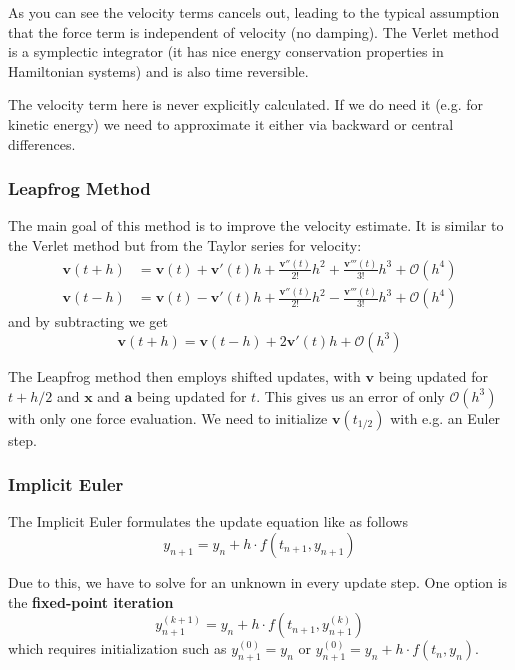 \documentclass{article}
\begin{document}
As you can see the velocity terms cancels out, leading to the typical assumption that the force term is independent of velocity (no damping).
The Verlet method is a symplectic integrator (it has nice energy conservation properties in Hamiltonian systems) and is also time reversible.

The velocity term here is never explicitly calculated.
If we do need it (e.g. for kinetic energy) we need to approximate it either via backward or central differences.

\subsubsection{Leapfrog Method}
The main goal of this method is to improve the velocity estimate.
It is similar to the Verlet method but from the Taylor series for velocity:
\begin{align}
    \bm{v}(t+h) &= \bm{v}(t) + \bm{v}'(t)h + \frac{\bm{v}''(t)}{2!}h^2 + \frac{\bm{v}'''(t)}{3!} h^3 + \mathcal{O}(h^4)\\
    \bm{v}(t-h) &= \bm{v}(t) - \bm{v}'(t)h + \frac{\bm{v}''(t)}{2!}h^2 - \frac{\bm{v}'''(t)}{3!} h^3 + \mathcal{O}(h^4)
\end{align}
and by subtracting we get
\begin{equation}
    \bm{v}(t+h) = \bm{v}(t-h) + 2\bm{v}'(t)h + \mathcal{O}(h^3)
\end{equation}

The Leapfrog method then employs shifted updates, with $\bm{v}$ being updated for $t+h/2$ and $\bm{x}$ and $\bm{a}$ being updated for $t$.
This gives us an error of only $\mathcal{O}(h^3)$ with only one force evaluation.
We need to initialize $\bm{v}(t_{1/2})$ with e.g. an Euler step.

\subsubsection{Implicit Euler}
The Implicit Euler formulates the update equation like as follows
\begin{equation}
    y_{n+1} = y_n + h \cdot f(t_{n+1}, y_{n+1})
\end{equation}

Due to this, we have to solve for an unknown in every update step.
One option is the \textbf{fixed-point iteration}
\begin{equation}
    y_{n+1}^{(k+1)} = y_n + h \cdot f(t_{n+1}, y_{n+1}^{(k)})
\end{equation}
which requires initialization such as $y_{n+1}^{(0)} = y_n$ or $y_{n+1}^{(0)} = y_n + h \cdot f(t_n, y_n)$.
\end{document}
